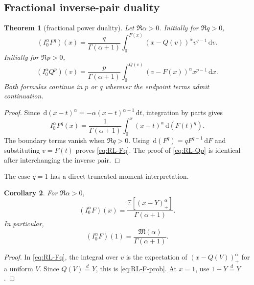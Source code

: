 \documentclass[11pt,oneside]{article}
\newtheorem{theorem}{Theorem}[section]
\newtheorem{corollary}[theorem]{Corollary}
\theoremstyle{definition}
\newcommand{\F}{F}
\newcommand{\Q}{Q}
\newcommand{\M}{\mathfrak M}
\newcommand{\E}{\mathbb E}
\newcommand{\dd}{\,\mathrm d}
\begin{document}
\subsection{Fractional inverse-pair duality}

\begin{theorem}[fractional power duality]\label{thm:fractional-duality}
Let \(\Re\alpha>0\).  Initially for \(\Re q>0\),
\begin{equation}\label{eq:RL-Fq}
 (I_0^\alpha\F^q)(x)
 =\frac{q}{\Gamma(\alpha+1)}
 \int_0^{\F(x)}(x-\Q(v))^\alpha v^{q-1}\dd v.
\end{equation}
Initially for \(\Re p>0\),
\begin{equation}\label{eq:RL-Qp}
 (I_0^\alpha\Q^p)(v)
 =\frac{p}{\Gamma(\alpha+1)}
 \int_0^{\Q(v)}(v-\F(x))^\alpha x^{p-1}\dd x.
\end{equation}
Both formulas continue in \(p\) or \(q\) wherever the endpoint terms admit continuation.
\end{theorem}

\begin{proof}
Since \(\dd(x-t)^\alpha=-\alpha(x-t)^{\alpha-1}\dd t\), integration by parts gives
\[
 I_0^\alpha\F^q(x)
 =\frac1{\Gamma(\alpha+1)}
 \int_0^x(x-t)^\alpha\dd(\F(t)^q).
\]
The boundary terms vanish when \(\Re q>0\).  Using
\(\dd(\F^q)=q\F^{q-1}\dd\F\) and substituting \(v=\F(t)\) proves
\cref{eq:RL-Fq}.  The proof of \cref{eq:RL-Qp} is identical after interchanging the
inverse pair.
\end{proof}

The case \(q=1\) has a direct truncated-moment interpretation.

\begin{corollary}\label{cor:RL-F-prob}
For \(\Re\alpha>0\),
\begin{equation}\label{eq:RL-F-prob}
 (I_0^\alpha\F)(x)
 =\frac{\E[(x-Y)_+^\alpha]}{\Gamma(\alpha+1)}.
\end{equation}
In particular,
\begin{equation}\label{eq:RL-F-at-one}
 (I_0^\alpha\F)(1)
 =\frac{\M(\alpha)}{\Gamma(\alpha+1)}.
\end{equation}
\end{corollary}

\begin{proof}
In \cref{eq:RL-Fq}, the integral over \(v\) is the expectation of
\((x-\Q(V))_+^\alpha\) for a uniform \(V\).  Since \(\Q(V)\overset d=Y\), this is
\cref{eq:RL-F-prob}.  At \(x=1\), use \(1-Y\overset d=Y\).
\end{proof}
\end{document}
